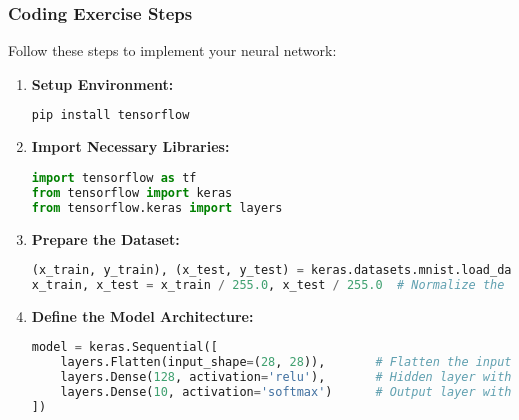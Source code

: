 \documentclass[aspectratio=169]{beamer}
\begin{document}
\begin{frame}[fragile]
    \frametitle{Coding Exercise Steps}
    Follow these steps to implement your neural network:

    \begin{enumerate}
        \item \textbf{Setup Environment:}
        \begin{lstlisting}[language=bash]
pip install tensorflow
        \end{lstlisting}

        \item \textbf{Import Necessary Libraries:}
        \begin{lstlisting}[language=python]
import tensorflow as tf
from tensorflow import keras
from tensorflow.keras import layers
        \end{lstlisting}

        \item \textbf{Prepare the Dataset:}
        \begin{lstlisting}[language=python]
(x_train, y_train), (x_test, y_test) = keras.datasets.mnist.load_data()
x_train, x_test = x_train / 255.0, x_test / 255.0  # Normalize the data
        \end{lstlisting}

        \item \textbf{Define the Model Architecture:}
        \begin{lstlisting}[language=python]
model = keras.Sequential([
    layers.Flatten(input_shape=(28, 28)),       # Flatten the input
    layers.Dense(128, activation='relu'),       # Hidden layer with ReLU
    layers.Dense(10, activation='softmax')      # Output layer with Softmax
])
        \end{lstlisting}
    \end{enumerate}
\end{frame}
\end{document}
